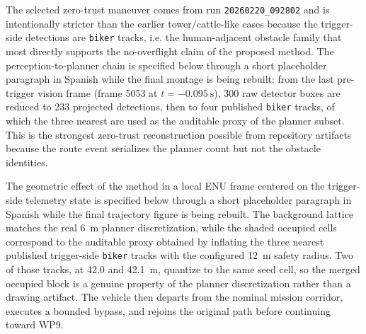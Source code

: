 \documentclass[journal,twoside,web]{ieeecolor}
\begin{document}
The selected zero-trust maneuver comes from run \texttt{20260220\_092802} and is intentionally stricter than the earlier tower/cattle-like cases because the trigger-side detections are \texttt{biker} tracks, i.e. the human-adjacent obstacle family that most directly supports the no-overflight claim of the proposed method. The perception-to-planner chain is specified below through a short placeholder paragraph in Spanish while the final montage is being rebuilt: from the last pre-trigger vision frame (frame 5053 at \(t=-\SI{0.095}{\second}\)), 300 raw detector boxes are reduced to 233 projected detections, then to four published \texttt{biker} tracks, of which the three nearest are used as the auditable proxy of the planner subset. This is the strongest zero-trust reconstruction possible from repository artifacts because the route event serializes the planner count but not the obstacle identities.


The geometric effect of the method in a local ENU frame centered on the trigger-side telemetry state is specified below through a short placeholder paragraph in Spanish while the final trajectory figure is being rebuilt. The background lattice matches the real \SI{6}{\meter} planner discretization, while the shaded occupied cells correspond to the auditable proxy obtained by inflating the three nearest published trigger-side \texttt{biker} tracks with the configured \SI{12}{\meter} safety radius. Two of those tracks, at 42.0 and \SI{42.1}{\meter}, quantize to the same seed cell, so the merged occupied block is a genuine property of the planner discretization rather than a drawing artifact. The vehicle then departs from the nominal mission corridor, executes a bounded bypass, and rejoins the original path before continuing toward WP9.

\end{document}
